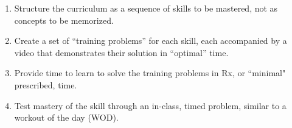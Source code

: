 \begin{enumerate}

\item Structure the curriculum as a sequence of skills to be mastered, not as concepts to be memorized. %

\item Create a set of ``training problems'' for each skill, each accompanied by a video that demonstrates their solution in ``optimal'' time. %

\item Provide time to learn to solve the training problems in Rx, or ``minimal" prescribed, time. %

\item Test mastery of the skill through an in-class, timed problem, similar to a workout of the day (WOD). %


\end{enumerate}
